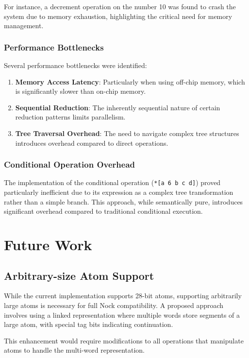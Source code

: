 \documentclass[twoside]{article}
\begin{document}
For instance, a decrement operation on the number 10 was found to crash the system due to memory exhaustion, highlighting the critical need for memory management.

\subsubsection{Performance Bottlenecks}

Several performance bottlenecks were identified:

\begin{enumerate}
  \item \textbf{Memory Access Latency}: Particularly when using off-chip memory, which is significantly slower than on-chip memory.
  \item \textbf{Sequential Reduction}: The inherently sequential nature of certain reduction patterns limits parallelism.
  \item \textbf{Tree Traversal Overhead}: The need to navigate complex tree structures introduces overhead compared to direct operations.
\end{enumerate}

\subsubsection{Conditional Operation Overhead}

The implementation of the conditional operation (\texttt{*[a 6 b c d]}) proved particularly inefficient due to its expression as a complex tree transformation rather than a simple branch. This approach, while semantically pure, introduces significant overhead compared to traditional conditional execution.

\section{Future Work}

\subsection{Arbitrary-size Atom Support}

While the current implementation supports 28-bit atoms, supporting arbitrarily large atoms is necessary for full Nock compatibility. A proposed approach involves using a linked representation where multiple words store segments of a large atom, with special tag bits indicating continuation.

This enhancement would require modifications to all operations that manipulate atoms to handle the multi-word representation.
\end{document}
